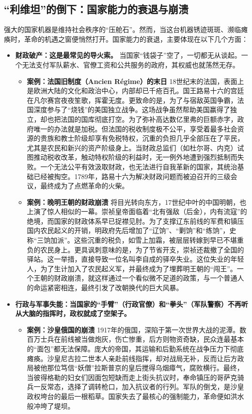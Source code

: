 \subsection{“利维坦”的倒下：国家能力的衰退与崩溃}

强大的国家机器是维持社会秩序的“压舱石”。然而，当这台机器锈迹斑斑、濒临瘫痪时，革命的机遇之窗便悄然打开。国家能力的衰退，主要体现在以下几个方面：
\begin{itemize}
\item \textbf{财政破产：这是最常见的导火索。} 当国家“钱袋子”空了，一切都无从谈起。一个无法支付军队薪水、官僚工资和公共服务的政府，其权威也就荡然无存。
    \begin{itemize}
    \item \textbf{案例：法国旧制度（Ancien Régime）的末日}
        18世纪末的法国，表面上是欧洲大陆的文化和政治中心，内部却已千疮百孔。国王路易十六的宫廷在凡尔赛宫夜夜笙歌，挥霍无度。更致命的是，为了与宿敌英国争霸，法国深度参与了“烧钱”的美国独立战争。这场战争虽然帮助美国赢得了独立，却也把法国的国库彻底打空。为了弥补高达数亿里弗的巨额赤字，政府唯一的办法就是加税。但法国的税收制度极不公平，享受着最多社会资源的贵族和教士阶级却享有免税特权，沉重的负担几乎全部压在了平民，尤其是农民和新兴的资产阶级身上。当财政总监们（如杜尔哥、内克）试图推动税收改革，触动特权阶级的利益时，无一例外地遭到强烈抵制而失败。一个无法公平有效汲取财政，也无法进行自我革新的国家，其统治基础已经被掏空。1789年，路易十六为解决财政问题而被迫召开的三级会议，最终成为了点燃革命的火柴。
    \item \textbf{案例：晚明王朝的财政崩溃}
        将目光转向东方，17世纪中叶的中国明朝，也上演了惊人相似的一幕。崇祯皇帝面临着“北有强敌（后金），内有流寇”的绝境，而国家的财政体系早已捉襟见肘。为了支撑辽东前线的军费和镇压国内农民起义的开销，明政府先后增加了“辽饷”、“剿饷”和“练饷”，史称“三饷加派”。这些沉重的税负，如雪上加霜，被层层转嫁到早已不堪重负的农民身上。更具讽刺意味的是，为了节省开支，崇祯还裁撤了全国的驿站。这一举措，直接导致一位名叫李自成的驿卒失业。这位失业的年轻人，为了生计加入了农民起义军，并最终成为了埋葬明王朝的“闯王”。一个王朝的财政崩溃，就这样通过一个看似微不足道的政策，与一个普通人的命运紧密相连，最终引发了改朝换代的巨大风暴。
    \end{itemize}
\item \textbf{行政与军事失能：当国家的“手臂”（行政官僚）和“拳头”（军队警察）不再听从大脑的指挥时，政权就成了空架子。}
    \begin{itemize}
    \item \textbf{案例：沙皇俄国的崩溃}
        1917年的俄国，深陷于第一次世界大战的泥潭。数百万士兵在前线被当做炮灰，伤亡惨重，后方则物资奇缺，民众连最基本的“面包”都无法保障。庞大的帝国，其运输和后勤系统在战争压力下彻底瘫痪。沙皇尼古拉二世本人亲赴前线指挥，却对战局无补，反而让后方政局被他那位笃信“妖僧”拉斯普京的皇后搅得乌烟瘴气，腐败横行。最终，当彼得格勒的妇女们因面包短缺而走上街头抗议时，奉命镇压的哥萨克骑兵一反常态，选择了调转枪口，加入抗议者的行列。军队的倒戈，是沙皇政权垮台的最后一根稻草。国家失去了最核心的强制能力，革命便如洪水般冲垮了堤坝。

\end{itemize}
\end{itemize}
